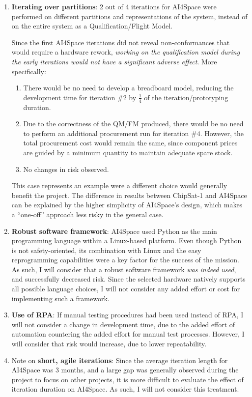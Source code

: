 \documentclass[a4paper,nobib,justified,final]{tufte-book}
\begin{document}
\begin{enumerate}
	
	\item \textbf{Iterating over partitions}:
	2 out of 4 iterations for AI4Space were performed on different partitions and representations of the system, instead of on the entire system as a Qualification/Flight Model.

	Since the first AI4Space iterations did not reveal non-conformances that would require a hardware rework, \emph{working on the qualification model during the early iterations would not have a significant adverse effect}. More specifically:
	\begin{enumerate}[itemsep=-2ex]
		\item There would be no need to develop a breadboard model, reducing the development time for iteration \#2 by \(\frac{1}{4}\) of the iteration/prototyping duration.
		\item Due to the correctness of the \acs{QM}/\acs{FM} produced, there would be no need to perform an additional procurement run for iteration \#4. However, the total procurement cost would remain the same, since component prices are guided by a minimum quantity to maintain adequate spare stock.
		\item No changes in risk observed.
	\end{enumerate}

	This case represents an example were a different choice would generally benefit the project. The difference in results between ChipSat-1 and AI4Space can be explained by the higher simplicity of AI4Space's design, which makes a ``one-off'' approach less risky in the general case.

	\item \textbf{Robust software framework}:
	AI4Space used Python as the main programming language within a Linux-based platform. Even though Python is not safety-oriented, its combination with Linux and the easy reprogramming capabilities were a key factor for the success of the mission. As such, I will consider that a robust software framework \emph{was indeed used}, and successfully decreased risk. Since the selected hardware natively supports all possible language choices, I will not consider any added effort or cost for implementing such a framework.

	\item \textbf{Use of \acl{RPA}}:
	If manual testing procedures had been used instead of \acs{RPA}, I will not consider a change in development time, due to the added effort of automation countering the added effort for manual test processes. However, I will consider that risk would increase, due to lower repeatability.

	\item Note on \textbf{short, agile iterations}: Since the average iteration length for AI4Space was 3 months, and a large gap was generally observed during the project to focus on other projects, it is more difficult to evaluate the effect of iteration duration on AI4Space. As such, I will not consider this treatment.
\end{enumerate}
\end{document}
